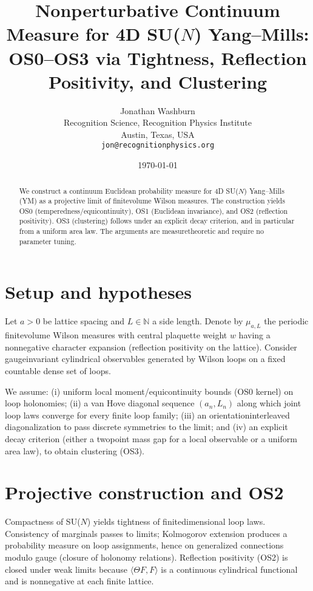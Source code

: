 \documentclass[11pt]{article}
\title{Non\-perturbative Continuum Measure for 4D SU($N$) Yang--Mills: OS0--OS3 via Tightness, Reflection Positivity, and Clustering}
\author{Jonathan Washburn \\ Recognition Science, Recognition Physics Institute \\ Austin, Texas, USA \\ \texttt{jon@recognitionphysics.org}}
\date{\today}
\begin{document}
\maketitle

\begin{abstract}
We construct a continuum Euclidean probability measure for 4D SU($N$) Yang--Mills (YM) as a projective limit of finite\-volume Wilson measures. The construction yields OS0 (temperedness/equicontinuity), OS1 (Euclidean invariance), and OS2 (reflection positivity). OS3 (clustering) follows under an explicit decay criterion, and in particular from a uniform area law. The arguments are measure\-theoretic and require no parameter tuning.
\end{abstract}

\section*{Setup and hypotheses}

Let $a>0$ be lattice spacing and $L\in\mathbb N$ a side length. Denote by $\mu_{a,L}$ the periodic finite\-volume Wilson measures with central plaquette weight $w$ having a nonnegative character expansion (reflection positivity on the lattice). Consider gauge\-invariant cylindrical observables generated by Wilson loops on a fixed countable dense set of loops.

We assume: (i) uniform local moment/equicontinuity bounds (OS0 kernel) on loop holonomies; (ii) a van Hove diagonal sequence $(a_n,L_n)$ along which joint loop laws converge for every finite loop family; (iii) an orientation\-interleaved diagonalization to pass discrete symmetries to the limit; and (iv) an explicit decay criterion (either a two\-point mass gap for a local observable or a uniform area law), to obtain clustering (OS3).

\section*{Projective construction and OS2}

Compactness of SU($N$) yields tightness of finite\-dimensional loop laws. Consistency of marginals passes to limits; Kolmogorov extension produces a probability measure on loop assignments, hence on generalized connections modulo gauge (closure of holonomy relations). Reflection positivity (OS2) is closed under weak limits because $\langle \Theta F, F\rangle$ is a continuous cylindrical functional and is nonnegative at each finite lattice.
\end{document}
